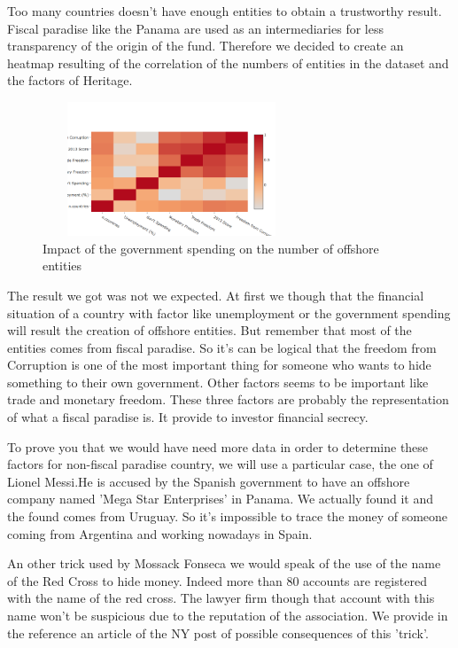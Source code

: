 \documentclass[11pt]{article}
\begin{document}
Too many countries doesn't have enough entities to obtain a trustworthy result. Fiscal paradise like the Panama are used as an intermediaries for less transparency of the origin of the fund. Therefore we decided to create an heatmap resulting of the correlation of the numbers of entities in the dataset and the factors of Heritage. 

\begin{figure}[h]
	\centering
    \includegraphics[width=7.7cm,height=4cm]{heat}
    \caption{Impact of the government spending on the number of offshore entities}
    \label{fig:j}
\end{figure}

The result we got was not we expected. At first we though that the financial situation of a country with factor like unemployment or the government spending will result the creation of offshore entities. But remember that most of the entities comes from fiscal paradise. So it's can be logical that the freedom from Corruption is one of the most important thing for someone who wants to hide something to their own government. Other factors seems to be important like trade and monetary freedom. These three factors are probably the representation of what a fiscal paradise is. It provide to investor financial secrecy.

To prove you that we would have need more data in order to determine these factors for non-fiscal paradise country, we will use a particular case, the one of Lionel Messi.He is accused by the Spanish government to have an offshore company named 'Mega Star Enterprises' in Panama\cite{Messi}. We actually found it and the found comes from Uruguay. So it's impossible to trace the money of someone coming from Argentina and working nowadays in Spain. 

An other trick used by Mossack Fonseca we would speak of the use of the name of the Red Cross to hide money. Indeed more than 80 accounts are registered with the name of the red cross. The lawyer firm though that account with this name won't be suspicious due to the reputation of the association. We provide in the reference an article of the NY post of possible consequences of this 'trick'. \cite{red_cross}
\end{document}
